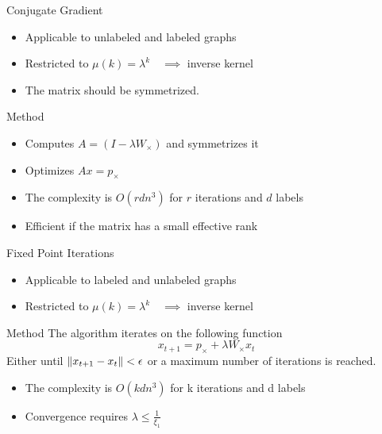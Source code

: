 \documentclass[compress]{beamer}
\DeclarePairedDelimiter{\norm}{\lVert}{\rVert}
\begin{document}
\begin{frame}{Conjugate Gradient}
	\begin{itemize}
		\item Applicable to unlabeled and labeled graphs
		\item Restricted to $\mu(k)=\lambda^k\quad\implies$ inverse kernel
		\item The matrix should be symmetrized.
	\end{itemize}
	\begin{block}{Method}
		\begin{itemize}
			\item Computes $A=(I-\lambda W_\times)$ and symmetrizes it
			\item Optimizes $Ax=p_\times$
		\end{itemize}
	\end{block}
\begin{itemize}
	\item The complexity is $O(rdn^3)$ for $r$ iterations and $d$ labels
	\item Efficient if the matrix has a small effective rank
\end{itemize}
\end{frame}
\begin{frame}{Fixed Point Iterations}
\begin{itemize}
	\item Applicable to labeled and unlabeled graphs
	\item Restricted to $\mu(k)=\lambda^k\quad\implies$ inverse kernel
\end{itemize}
\begin{block}{Method}
The algorithm iterates on the following function
\begin{equation*}
x_{t+1} = p_\times + \lambda W_{\times}x_t
\end{equation*}
Either until $\norm{x_{t+1}-x_t}<\epsilon$ or a maximum number of iterations is reached.
\end{block}
\begin{itemize}
	\item The complexity is $O(kdn^3)$ for k iterations and d labels
	\item Convergence requires $\lambda \leq \frac{1}{\xi_1}$
\end{itemize}
\end{frame}
\end{document}
